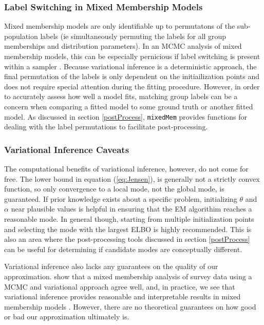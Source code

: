 \documentclass{article}\usepackage[]{graphicx}\usepackage[]{color}
\begin{document}
\subsubsection{Label Switching in Mixed Membership Models}
Mixed membership models are only identifiable up to permutatons of the sub-population labels (ie simultaneously permuting the labels for all group memberships and distribution parameters). In an MCMC analysis of mixed membership models, this can be especially pernicious if label switching is present within a sampler \citep{stephens2000dealing}. Because variational inference is a deterministic approach, the final permutation of the labels is only dependent on the initiailization points and does not require special attention during the fitting procedure. However, in order to accurately assess how well a model fits, matching group labels can be a concern when comparing a fitted model to some ground truth or another fitted model. As discussed in section \ref{postProcess}, \texttt{mixedMem} provides functions for dealing with the label permutations to facilitate post-processing.   

\subsubsection{Variational Inference Caveats}
The computational benefits of variational inference, however, do not come for free. The lower bound in equation (\ref{eq:Jensen}), is generally not a strictly convex function, so only convergence to a local mode, not the global mode, is guaranteed. If prior knowledge exists about a specific problem, initializing $\theta$ and $\alpha$ near plausible values is helpful in ensuring that the EM algorithim reaches a reasonable mode. In general though, starting from multiple initialization points and selecting the mode with the largest ELBO is highly recommended. This is also an area where the post-processing tools discussed in section \ref{postProcess} can be useful for determining if candidate modes are conceptually different.

Variational inference also lacks any guarantees on the quality of our approximation. \cite{erosheva2007describing} show that a mixed membership analysis of survey data using a MCMC and variational approach agree well, and, in practice, we see that variational inference provides reasonable and interpretable results in mixed membership models \citep{LDA, erosheva2004mixed, airoldi2009mixed}. However, there are no theoretical guarantees on how good or bad our approximation ultimately is.
\end{document}
